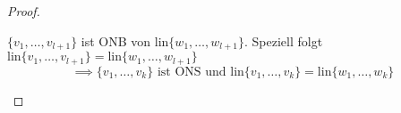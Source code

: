 \begin{proof}
\begin{enumerate}
        $\{v_1,\dots,v_{l+1}\}$ ist ONB von $\mathrm{lin}\{w_1,\dots,w_{l+1}\}$. Speziell folgt $\mathrm{lin}\{v_1,\dots,v_{l+1}\} = \mathrm{lin}\{w_1,\dots,w_{l+1}\}$
        \[
            \implies \{v_1,\dots,v_k\} \text{ ist ONS und } \mathrm{lin}\{v_1,\dots,v_k\} = \mathrm{lin}\{w_1,\dots,w_k\}
        \]
    \end{enumerate}
\end{proof}